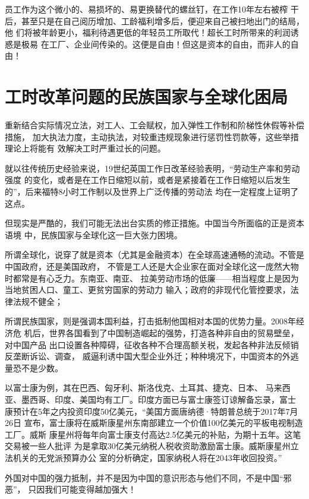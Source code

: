 
员工作为这个微小的、易损坏的、易更换替代的螺丝钉，在工作10年左右被榨
干后，甚至只是在自己阅历增加、工龄福利增多后，便迎来自己被扫地出门的结局，他
们将被年龄更小，福利待遇更低的年轻员工所取代！超长工时所带来的利润诱惑是极易
在工厂、企业间传染的。这便是自由！但这是资本的自由，而非人的自由！

\section{工时改革问题的民族国家与全球化困局}

重新结合实际情况立法，对工人、工会赋权，加入弹性工作制和阶梯性休假等补偿措施，
加大执法力度，主动执法，对较重违规现象进行惩罚性罚款等，这些举措理论上将能有
效解决工时严重过长的问题。

就以往传统历史经验来说，19世纪英国工作日改革经验表明，“劳动生产率和劳动强度
的变化，或者是在工作日缩短以前，或者是紧接着在工作日缩短以后发生
的”，后来福特8小时工作制以及世界上广泛传播的劳动法
均在一定程度上证明了这点。

但现实是严酷的，我们可能无法出台实质的修正措施。中国当今所面临的正是资本语境
中，民族国家与全球化这一巨大张力困境。

所谓全球化，说穿了就是资本（尤其是金融资本）在全球高速通畅的流动。不管是中国政府，还是美国政府，
不管是工人还是大企业家在面对全球化这一庞然大物时都常是有心乏力。东南亚、南亚、
拉美劳动市场的低廉——相当程度上是因为当地贫困人口、童工、更贫穷国家的劳动力
输入；政府的非现代化管控要求，法律法规不健全；

所谓民族国家，则是强调本国利益，打击抵制他国相对本国的优势力量。2008年经济危
机后，世界各国看到了中国制造崛起的强势，打造各种非自由的贸易壁垒，对中国产品
出口设置各种障碍，征收各种不合理高额关税，发起各种非法反倾销反垄断诉讼、调查，
威逼利诱中国大型企业外迁；种种境况下，中国资本的外逃量恐不是少数。


以富士康\cite{foxconnwiki}为例，其在巴西、匈牙利、斯洛伐克、土耳其、捷克、日本、
马来西亚、墨西哥、印度、美国均有工厂。印度方面已与富士康签订谅解备忘录，富士
康预计在5年之内投资印度50亿美元，“美国方面唐纳德·特朗普总统于2017年7月26日
宣布，富士康将在威斯康星州东南部建立一个价值100亿美元的平板电视制造工厂。威斯
康星州将每年向富士康支付高达2.5亿美元的补贴，为期十五年。这笔交易被一些人批评
为是拿取30亿美元纳税人税收资助激励富士康。威斯康星州立法机关的无党派预算办公
室的分析确定，国家纳税人将在2043年收回投资。”

外国对中国的强力抵制，并不是因为中国的意识形态与他们不同，不是中国“邪恶”，
只因我们可能变得越加强大！

